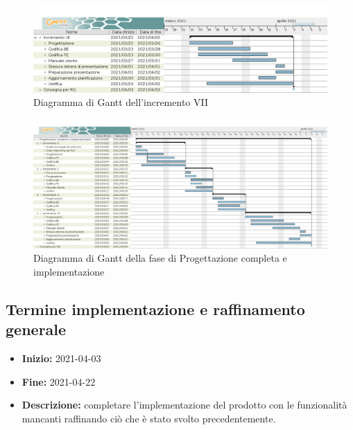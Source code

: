 \begin{figure}[H]
    \centering
    \includegraphics[width=1\linewidth]{res/images/pianificazione/incremento_7.png}
    \caption{Diagramma di Gantt dell'incremento VII}
    \label{fig:_Gantt incremento VII}
\end{figure}

\begin{figure}[H]
    \centering
    \includegraphics[width=1\linewidth]{res/images/pianificazione/progettazione_completa_e_implementazione.png}
    \caption{Diagramma di Gantt della fase di Progettazione completa e implementazione}
    \label{fig:_Gantt progettazione completa e implementazione}
\end{figure}



\subsection{Termine implementazione e raffinamento generale} \label{_pianificazioneTermineImplementazione}
\begin{itemize}
    \item [] \textbf{Inizio:} 2021-04-03
    \item [] \textbf{Fine:} 2021-04-22
    \item [] \textbf{Descrizione:} completare l'implementazione del prodotto con le funzionalità mancanti raffinando ciò che è stato svolto precedentemente.
\end{itemize}

